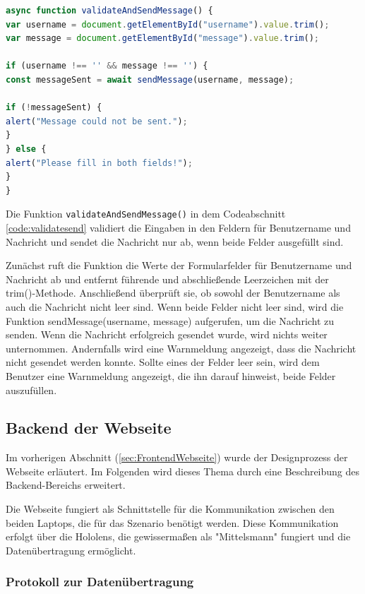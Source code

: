 \begin{itemize}
\begin{lstlisting}[language=JavaScript, caption={Javascript | Validierung und Senden der Message}, label=code:validatesend]
async function validateAndSendMessage() {
var username = document.getElementById("username").value.trim();
var message = document.getElementById("message").value.trim();

if (username !== '' && message !== '') {
const messageSent = await sendMessage(username, message);

if (!messageSent) {
alert("Message could not be sent.");
}
} else {
alert("Please fill in both fields!");
}
}
\end{lstlisting}
Die Funktion \texttt{validateAndSendMessage()} in dem Codeabschnitt \ref{code:validatesend} validiert die Eingaben in den Feldern für Benutzername und Nachricht und sendet die Nachricht nur ab, wenn beide Felder ausgefüllt sind.

Zunächst ruft die Funktion die Werte der Formularfelder für Benutzername und Nachricht ab und entfernt führende und abschließende Leerzeichen mit der trim()-Methode. Anschließend überprüft sie, ob sowohl der Benutzername als auch die Nachricht nicht leer sind. Wenn beide Felder nicht leer sind, wird die Funktion sendMessage(username, message) aufgerufen, um die Nachricht zu senden. Wenn die Nachricht erfolgreich gesendet wurde, wird nichts weiter unternommen. Andernfalls wird eine Warnmeldung angezeigt, dass die Nachricht nicht gesendet werden konnte. Sollte eines der Felder leer sein, wird dem Benutzer eine Warnmeldung angezeigt, die ihn darauf hinweist, beide Felder auszufüllen.

\subsection{\label{sec:webBackend}Backend der Webseite}

Im vorherigen Abschnitt (\ref{sec:FrontendWebseite}) wurde der Designprozess der Webseite erläutert. Im Folgenden wird dieses Thema durch eine Beschreibung des Backend-Bereichs erweitert.

Die Webseite fungiert als Schnittstelle für die Kommunikation zwischen den beiden Laptops, die für das Szenario benötigt werden. Diese Kommunikation erfolgt über die Hololens, die gewissermaßen als "Mittelsmann" fungiert und die Datenübertragung ermöglicht.
\subsubsection{Protokoll zur Datenübertragung}


\end{itemize}
